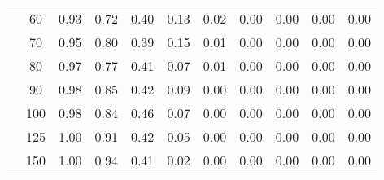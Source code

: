 \begin{table}[t]
\begin{center}
\begin{subtable}[c]{\textwidth}
\begin{center}
\begin{tabular}{rcccccccccc}
                                        & \multicolumn{1}{c|}{60}  & \num{0.93}  & \num{0.72}  & \num{0.40}  & \num{0.13}  & \num{0.02}  & \num{0.00}  & \num{0.00}  & \num{0.00}  & \num{0.00}  \\
                                        & \multicolumn{1}{c|}{70}  & \num{0.95}  & \num{0.80}  & \num{0.39}  & \num{0.15}  & \num{0.01}  & \num{0.00}  & \num{0.00}  & \num{0.00}  & \num{0.00}  \\
                                        & \multicolumn{1}{c|}{80}  & \num{0.97}  & \num{0.77}  & \num{0.41}  & \num{0.07}  & \num{0.01}  & \num{0.00}  & \num{0.00}  & \num{0.00}  & \num{0.00}  \\
                                        & \multicolumn{1}{c|}{90}  & \num{0.98}  & \num{0.85}  & \num{0.42}  & \num{0.09}  & \num{0.00}  & \num{0.00}  & \num{0.00}  & \num{0.00}  & \num{0.00}  \\
                                        & \multicolumn{1}{c|}{100}  & \num{0.98}  & \num{0.84}  & \num{0.46}  & \num{0.07}  & \num{0.00}  & \num{0.00}  & \num{0.00}  & \num{0.00}  & \num{0.00}  \\
                                        & \multicolumn{1}{c|}{125}  & \num{1.00}  & \num{0.91}  & \num{0.42}  & \num{0.05}  & \num{0.00}  & \num{0.00}  & \num{0.00}  & \num{0.00}  & \num{0.00}  \\
                                        & \multicolumn{1}{c|}{150}  & \num{1.00}  & \num{0.94}  & \num{0.41}  & \num{0.02}  & \num{0.00}  & \num{0.00}  & \num{0.00}  & \num{0.00}  & \num{0.00}  \\
                                    \end{tabular}
            \end{center}
        \end{subtable}

        \vspace{5mm}


\end{center}
\end{table}
